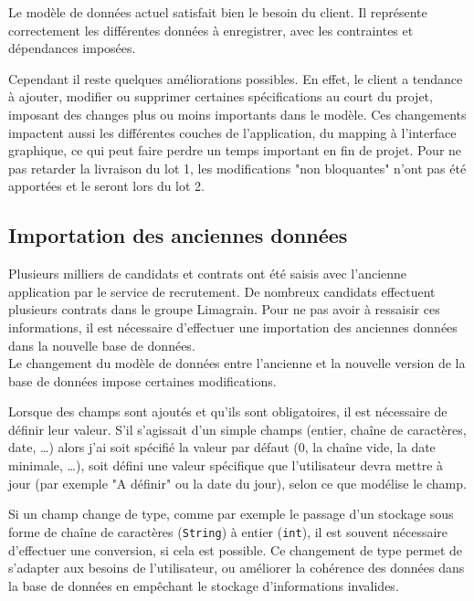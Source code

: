 Le modèle de données actuel satisfait bien le besoin du client.
Il représente correctement les différentes données à enregistrer, avec les contraintes et dépendances imposées.

Cependant il reste quelques améliorations possibles.
En effet, le client a tendance à ajouter, modifier ou supprimer certaines spécifications au court du projet, imposant des changes plus ou moins importants dans le modèle.
Ces changements impactent aussi les différentes couches de l'application, du mapping à l'interface graphique, ce qui peut faire perdre un temps important en fin de projet.
Pour ne pas retarder la livraison du lot 1, les modifications "non bloquantes" n'ont pas été apportées et le seront lors du lot 2.


\subsection{Importation des anciennes données}

Plusieurs milliers de candidats et contrats ont été saisis avec l'ancienne application par le service de recrutement.
De nombreux candidats effectuent plusieurs contrats dans le groupe Limagrain.
Pour ne pas avoir à ressaisir ces informations, il est nécessaire d'effectuer une importation des anciennes données dans la nouvelle base de données.
\\

Le changement du modèle de données entre l'ancienne et la nouvelle version de la base de données impose certaines modifications.

Lorsque des champs sont ajoutés et qu'ils sont obligatoires, il est nécessaire de définir leur valeur.
S'il s'agissait d'un simple champs (entier, chaîne de caractères, date, \ldots) alors j'ai soit spécifié la valeur par défaut (0, la chaîne vide, la date minimale, \ldots), soit défini une valeur spécifique que l'utilisateur devra mettre à jour (par exemple "A définir" ou la date du jour), selon ce que modélise le champ.

Si un champ change de type, comme par exemple le passage d'un stockage sous forme de chaîne de caractères (\lstinline{String}) à entier (\lstinline{int}), il est souvent nécessaire d'effectuer une conversion, si cela est possible.
Ce changement de type permet de s'adapter aux besoins de l'utilisateur, ou améliorer la cohérence des données dans la base de données en empêchant le stockage d'informations invalides.

